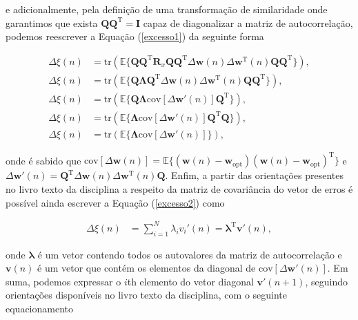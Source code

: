 \documentclass[a4paper,10pt]{article}
\begin{document}
\begin{enumerate}
\begin{enumerate}
						e adicionalmente, pela definição de uma transformação de similaridade onde garantimos que exista $\mathbf{Q} \mathbf{Q}^{\text{T}} = \mathbf{I}$ capaz de diagonalizar a matriz de autocorrelação, podemos reescrever a Equação (\ref{excesso1}) da seguinte forma

						\begin{align}
							\Delta \xi(n) &= \text{tr}(\mathbb{E}\{\mathbf{Q} \mathbf{Q}^{\text{T}} \mathbf{R}_{x} \mathbf{Q} \mathbf{Q}^{\text{T}} \Delta \mathbf{w}(n) \Delta \mathbf{w}^{\text{T}}(n) \mathbf{Q} \mathbf{Q}^{\text{T}}\}), \\
							\Delta \xi(n) &= \text{tr}(\mathbb{E}\{\mathbf{Q} \mathbf{\Lambda} \mathbf{Q}^{\text{T}} \Delta \mathbf{w}(n) \Delta \mathbf{w}^{\text{T}}(n) \mathbf{Q} \mathbf{Q}^{\text{T}}\}), \\
							\Delta \xi(n) &= \text{tr}(\mathbb{E}\{\mathbf{Q} \mathbf{\Lambda} \text{cov} \left[\Delta \mathbf{w}'(n)\right] \mathbf{Q}^{\text{T}}\}), \\
							\Delta \xi(n) &= \text{tr}(\mathbb{E}\{\mathbf{\Lambda} \text{cov} \left[\Delta \mathbf{w}'(n)\right] \mathbf{Q}^{\text{T}} \mathbf{Q}\}), \\
							\Delta \xi(n) &= \text{tr}(\mathbb{E}\{\mathbf{\Lambda} \text{cov} \left[\Delta \mathbf{w}'(n)\right]\}), \label{excesso2}
						\end{align}

						onde é sabido que $\text{cov} \left[\Delta \mathbf{w}(n)\right] = \mathbb{E}\{(\mathbf{w}(n) - \mathbf{w}_{\text{opt}}) (\mathbf{w}(n) - \mathbf{w}_{\text{opt}})^{\text{T}}\}$ e $\Delta \mathbf{w}'(n) = \mathbf{Q}^{\text{T}} \Delta \mathbf{w}(n) \Delta \mathbf{w}^{\text{T}}(n) \mathbf{Q}$.
						Enfim, a partir das orientações presentes no livro texto da disciplina a respeito da matriz de covariância do vetor de erros é possível ainda escrever a Equação (\ref{excesso2}) como

						\begin{align}
							\Delta \xi(n) &= \sum^{N}_{i = 1} \lambda_{i} v_{i}'(n) = \mathbf{\lambda}^{\text{T}} \mathbf{v}'(n),
						\end{align}

						onde $\mathbf{\lambda}$ é um vetor contendo todos os autovalores da matriz de autocorrelação e $\mathbf{v}(n)$ é um vetor que contém os elementos da diagonal de $\text{cov} \left[\Delta \mathbf{w}'(n)\right]$. Em suma, podemos 
						expressar o $i$th elemento do vetor diagonal $\mathbf{v}'(n + 1)$, seguindo orientações disponíveis no livro texto da disciplina, com o seguinte equacionamento


\end{enumerate}
\end{enumerate}
\end{document}
